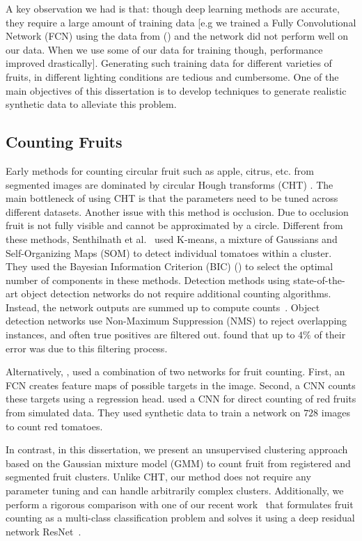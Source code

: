 A key observation we had is that: though deep learning methods are accurate, they require a large amount of training data [e.g we trained a Fully Convolutional Network (FCN) using the data from (\cite{bargoti2017image}) and the network did not perform well on our data. When we use some of our data for training though, performance improved drastically]. Generating such training data for different varieties of fruits, in different lighting conditions are tedious and cumbersome. One of the main objectives of this dissertation is to develop techniques to generate realistic synthetic data to alleviate this problem.

\subsection{Counting Fruits} Early methods for counting circular fruit such as apple, citrus, etc. from segmented images are dominated by circular Hough transforms (CHT) \cite{silwal2014apple,changyi2015apple,liu2016method}. The main bottleneck of using CHT is that the parameters need to be tuned across different datasets. Another issue with this method is occlusion. Due to occlusion fruit is not fully visible and cannot be approximated by a circle. Different from these methods, Senthilnath et al.~\cite{senthilnath2016detection} used  K-means, a mixture of Gaussians and Self-Organizing Maps (SOM) to detect individual tomatoes within a cluster. They used the Bayesian Information Criterion (BIC) (\cite{bic}) to select the optimal number of components in these methods. Detection methods using state-of-the-art object detection networks do not require additional counting algorithms. Instead, the network outputs are summed up to compute counts~\cite{bargoti_deep_2017, sa_deepfruits:_2016, stein_image_2016}. Object detection networks use Non-Maximum Suppression (NMS) to reject overlapping instances, and often true positives are filtered out. \cite{bargoti_deep_2017} found that up to $4\%$ of their error was due to this filtering process. 

Alternatively, \cite{chen_counting_2017}, used a combination of two networks for fruit counting. First, an FCN creates feature maps of possible targets in the image. Second, a CNN counts these targets using a regression head.\cite{maryam_rahnemoonfar_deep_2017} used a CNN for direct counting of red fruits from simulated data. They used synthetic data to train a network on $728$ images to count red tomatoes. 

In contrast, in this dissertation, we present an unsupervised clustering approach based on the Gaussian mixture model (GMM) to count fruit from registered and segmented fruit clusters. Unlike CHT, our method does not require any parameter tuning and can handle arbitrarily complex clusters. Additionally, we perform a rigorous comparison with one of our recent work~\cite{hani_apple_2018,hani_jfr_counting} that formulates fruit counting as a multi-class classification problem and solves it using a deep residual network ResNet~\cite{he_deep_2015}. 



